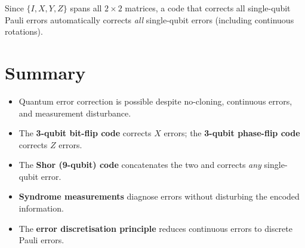 \documentclass[11pt]{article}
\theoremstyle{definition}
\begin{document}
Since $\{I,X,Y,Z\}$ spans all $2\times 2$ matrices, a code that corrects all single-qubit Pauli errors automatically corrects \emph{all} single-qubit errors (including continuous rotations).

\section{Summary}

\begin{itemize}
    \item Quantum error correction is possible despite no-cloning, continuous errors, and measurement disturbance.
    \item The \textbf{3-qubit bit-flip code} corrects $X$ errors; the \textbf{3-qubit phase-flip code} corrects $Z$ errors.
    \item The \textbf{Shor (9-qubit) code} concatenates the two and corrects \emph{any} single-qubit error.
    \item \textbf{Syndrome measurements} diagnose errors without disturbing the encoded information.
    \item The \textbf{error discretisation principle} reduces continuous errors to discrete Pauli errors.
\end{itemize}
\end{document}
